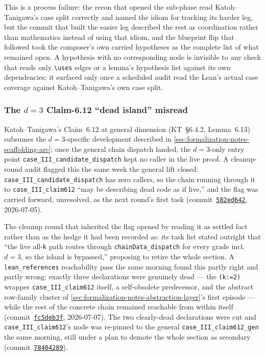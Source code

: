This is a process failure: the recon that opened the sub-phase read
Katoh--Tanigawa's case split correctly and named the idiom for tracking
its harder leg, but the commit that built the easier leg described the
rest as coordination rather than mathematics instead of using that idiom,
and the blueprint flip that followed took the composer's own carried
hypotheses as the complete list of what remained open. A hypothesis with
no corresponding node is invisible to any check that reads only
\texttt{\textbackslash uses} edges or a lemma's hypothesis list against
its own dependencies; it surfaced only once a scheduled audit read the
Lean's actual case coverage against Katoh--Tanigawa's own case split.

\subsubsection{The \texorpdfstring{$d = 3$}{d = 3} Claim-6.12 ``dead
island'' misread}

Katoh--Tanigawa's Claim~6.12 at general dimension (KT~\S6.4.2,
Lemma~6.13) subsumes the $d = 3$-specific development described in
\cref{sec:formalization-notes-scaffolding-arc}: once the general chain
dispatch landed, the $d = 3$-only entry point
\texttt{case\_III\_candidate\_dispatch} kept no caller in the live proof.
A cleanup-round audit flagged this the same week the general lift closed:
\texttt{case\_III\_candidate\_dispatch} has zero callers, so the chain
running through it to \texttt{case\_III\_claim612} ``may be describing
dead code as if live,'' and the flag was carried forward, unresolved, as
the next round's first task
(commit~\href{https://github.com/bryangingechen/CombinatorialRigidity/commit/582ed6420a860accc84ce67f2d168c04320011eb}{\texttt{582ed642}},
2026-07-05).

The cleanup round that inherited the flag opened by reading it as settled
fact rather than as the hedge it had been recorded as: its task list
stated outright that ``the live all-\texttt{k} path routes through
\texttt{chainData\_dispatch} for every grade incl.\ $d=3$, so the island
is bypassed,'' proposing to retire the whole section. A
\texttt{lean\_references} reachability pass the same morning found this
partly right and partly wrong: exactly three declarations were genuinely
dead --- the \texttt{(k:=2)} wrapper \texttt{case\_III\_claim612} itself,
a self-obsolete predecessor, and the abstract row-family cluster of
\cref{sec:formalization-notes-abstraction-layer}'s first episode --- while
the rest of the concrete chain remained reachable from within itself
(commit~\href{https://github.com/bryangingechen/CombinatorialRigidity/commit/fc5deb3f2607e47ba342a01aae5e29c43521d3be}{\texttt{fc5deb3f}},
2026-07-07). The two clearly-dead declarations were cut and
\texttt{case\_III\_claim612}'s node was re-pinned to the general
\texttt{case\_III\_claim612\_gen} the same morning, still under a plan to
demote the whole section as secondary
(commit~\href{https://github.com/bryangingechen/CombinatorialRigidity/commit/78404289a6dc0fa543a35aa8822f3ccc67ac783e}{\texttt{78404289}}).

